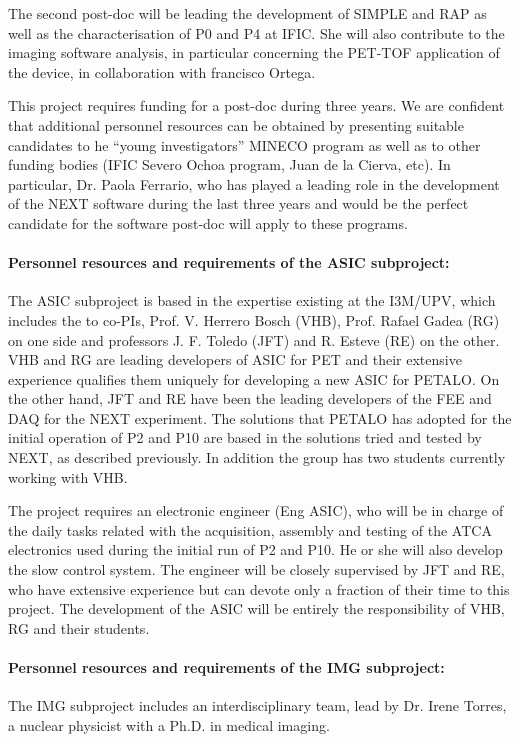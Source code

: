  The second post-doc will be leading the development of SIMPLE and RAP as well as the characterisation of P0 and P4 at IFIC. She will also contribute to the imaging software analysis, in particular concerning the PET-TOF application of the device, in collaboration with francisco Ortega.
 
This project requires funding for a post-doc during three years. We are confident that additional personnel resources can be obtained by presenting suitable candidates to he ``young investigators'' MINECO program as well as to other funding bodies (IFIC Severo Ochoa program, Juan de la Cierva, etc). In particular,  
Dr. Paola Ferrario, who has played a leading role in the development of the NEXT software during the last three years and would be the perfect candidate for the software post-doc will apply to these programs. 
 
 \paragraph{Personnel resources and requirements of the ASIC subproject:} 

The ASIC subproject is based in the expertise existing  at the I3M/UPV, which includes the to co-PIs, Prof. V. Herrero Bosch (VHB), Prof. Rafael Gadea (RG) on one side and professors J. F. Toledo (JFT) and R. Esteve (RE) on the other. VHB and RG are leading developers of ASIC for PET and their extensive experience qualifies them uniquely for developing a new ASIC for PETALO. On the other hand, JFT and RE have been the leading developers of the FEE and DAQ for the NEXT experiment. The solutions that PETALO has adopted for the initial operation of P2 and P10 are based in the solutions tried and tested by NEXT, as described previously. 
In addition the group has two students currently working with VHB.

The project requires an electronic engineer (Eng ASIC), who will be in charge of the daily tasks related with the acquisition, assembly and testing of the ATCA electronics used during the initial run of P2 and P10.  He or she will also develop the slow control system. The engineer will be closely supervised by JFT and RE, who have extensive experience but can devote only a fraction of their time to this project. The development of the ASIC will be entirely the responsibility of VHB, RG and their students. 

 \paragraph{Personnel resources and requirements of the IMG subproject:}
 The IMG subproject includes an interdisciplinary team, lead by Dr. Irene Torres, a nuclear physicist with a Ph.D. in medical imaging. 
 
